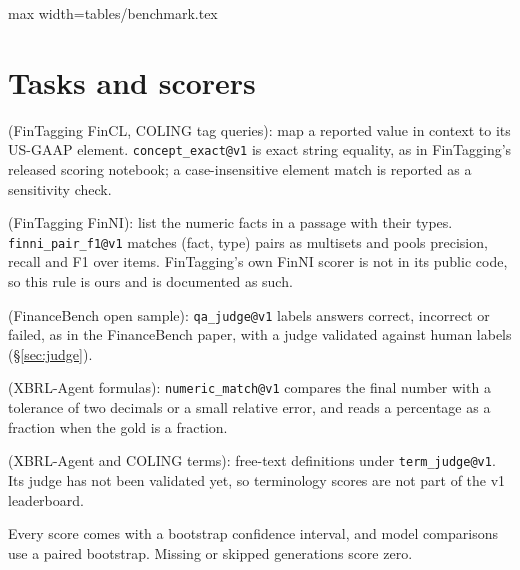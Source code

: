 \documentclass[10pt,twocolumn,a4paper]{article}
\makeatletter
\newcommand{\fe}{\textsc{FinEval}~v1}
\newcommand{\tabinput}[1]{\@@input #1 }
\makeatother
\begin{document}
\begin{table}[t]\centering\small
\caption{\fe{} items per task and split; ``primary'' excludes ambiguous items.}\label{tab:benchmark}
\begin{adjustbox}{max width=\columnwidth}\tabinput{tables/benchmark.tex}\end{adjustbox}
\end{table}

\section{Tasks and scorers}\label{sec:tasks}
\begin{description}[leftmargin=0pt]
\item[Concept tagging] (FinTagging FinCL, COLING tag queries): map a reported value in context to its
  US-GAAP element. \texttt{concept\_exact@v1} is exact string equality, as in FinTagging's released
  scoring notebook; a case-insensitive element match is reported as a sensitivity check.
\item[Fact extraction] (FinTagging FinNI): list the numeric facts in a passage with their types.
  \texttt{finni\_pair\_f1@v1} matches (fact, type) pairs as multisets and pools precision, recall and
  F1 over items. FinTagging's own FinNI scorer is not in its public code, so this rule is ours and is
  documented as such.
\item[Filing QA] (FinanceBench open sample): \texttt{qa\_judge@v1} labels answers correct, incorrect
  or failed, as in the FinanceBench paper, with a judge validated against human labels
  (\S\ref{sec:judge}).
\item[Financial calculation] (XBRL-Agent formulas): \texttt{numeric\_match@v1} compares the final
  number with a tolerance of two decimals or a small relative error, and reads a percentage as a
  fraction when the gold is a fraction.
\item[Terminology] (XBRL-Agent and COLING terms): free-text definitions under
  \texttt{term\_judge@v1}. Its judge has not been validated yet, so terminology scores are not part of
  the v1 leaderboard.
\end{description}
Every score comes with a bootstrap confidence interval, and model comparisons use a paired bootstrap.
Missing or skipped generations score zero.
\end{document}
